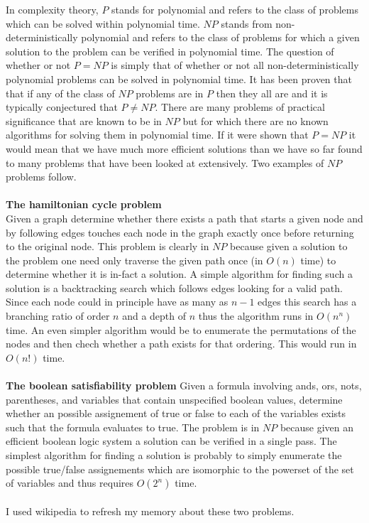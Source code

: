 \documentclass[11pt]{article}
\begin{document}
  
  \noindent
  In complexity theory, $P$ stands for polynomial and refers to the
  class of problems which can be solved within polynomial time.  $NP$
  stands from non-deterministically polynomial and refers to the class
  of problems for which a given solution to the problem can be
  verified in polynomial time.  The question of whether or not $P =
  NP$ is simply that of whether or not all non-deterministically
  polynomial problems can be solved in polynomial time.  It has been
  proven that that if any of the class of $NP$ problems are in $P$
  then they all are and it is typically conjectured that $P \ne NP$.
  There are many problems of practical significance that are known to
  be in $NP$ but for which there are no known algorithms for solving
  them in polynomial time.  If it were shown that $P = NP$ it would
  mean that we have much more efficient solutions than we have so far
  found to many problems that have been looked at extensively.  Two
  examples of $NP$ problems follow. \\
  \\
  \noindent
  \textbf{The hamiltonian cycle problem} \\
  Given a graph determine whether there exists a path that starts a
  given node and by following edges touches each node in the graph
  exactly once before returning to the original node.  This problem is
  clearly in $NP$ because given a solution to the problem one need
  only traverse the given path once (in $O(n)$ time) to determine
  whether it is in-fact a solution.  A simple algorithm for finding
  such a solution is a backtracking search which follows edges looking
  for a valid path.  Since each node could in principle have as many
  as $n - 1$ edges this search has a branching ratio of order $n$ and
  a depth of $n$ thus the algorithm runs in $O(n^n)$ time.  An even
  simpler algorithm would be to enumerate the permutations of the
  nodes and then chech whether a path exists for that ordering.  This
  would run in $O(n!)$ time. \\
  \\
  \noindent
  \textbf{The boolean satisfiability problem}
  Given a formula involving ands, ors, nots, parentheses, and
  variables that contain unspecified boolean values, determine whether
  an possible assignement of true or false to each of the variables
  exists such that the formula evaluates to true.  The problem is in
  $NP$ because given an efficient boolean logic system a solution can
  be verified in a single pass.  The simplest algorithm for finding a
  solution is probably to simply enumerate the possible true/false
  assignements which are isomorphic to the powerset of the set of
  variables and thus requires $O(2^n)$ time.\\
  \\
  \noindent
  I used wikipedia to refresh my memory about these two problems.
  
\end{document}
